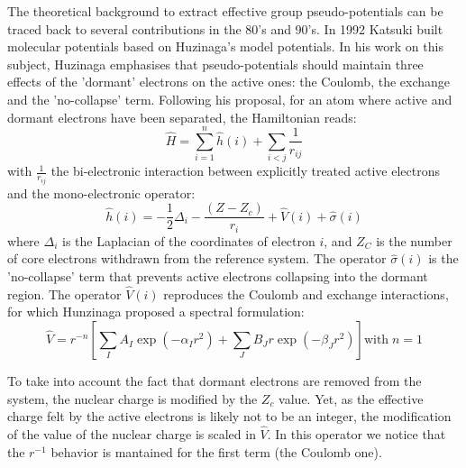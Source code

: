 \documentclass[12pt]{article}
\begin{document}
The theoretical background to extract effective group pseudo-potentials  can be traced back 
to several contributions in the 80's and  90's.\cite{Nicolas1980a, huzinaga_effective_1991, huzinaga_1994_1995, EGP5, EGP6, EGP9}
In 1992 Katsuki built molecular potentials based on Huzinaga's model potentials.\cite{katsuki_molecular_1992,katsuki_spectral_1993}
 In his work on this subject, Huzinaga emphasises that pseudo-potentials should maintain three effects of the
'dormant' electrons on the active ones: the Coulomb, the exchange and the 'no-collapse' term.\cite{huzinaga_effective_1991}
Following his proposal, for an atom where active and dormant electrons have been separated, the Hamiltonian reads:
\begin{equation}
\label{eq:atomicHamiltonian}
\hat{H} = \sum_{i=1}^n \hat{h}(i) +\sum_{i<j}\frac{1}{r_{ij}}
\end{equation}
with $\frac{1}{r_{ij}}$ the bi-electronic interaction
between explicitly treated active electrons and
the mono-electronic operator:
\begin{equation}
\label{eq:monoElectronicOperator}
\hat{h}(i) = -\frac{1}{2}\Delta_i - \frac{(Z-Z_c)}{r_i}+\hat{V}(i) + \hat{\sigma}(i)
\end{equation}
where $\Delta_i$ is the Laplacian of the coordinates of electron $i$, and 
$Z_C$ is the number of core electrons withdrawn from the reference system.
The operator $\hat{\sigma}(i)$ is the 'no-collapse' term that prevents active electrons
collapsing into the dormant region. The operator $\hat{V}(i)$ reproduces the 
Coulomb and exchange interactions, for which Hunzinaga proposed a spectral formulation:
\begin{equation}
\label{eq:HuzinagaMPVersion1Potential}
\hat{V} = r^{-n}\left[\sum_IA_I\exp(-\alpha_I r^2)+\sum_JB_Jr\exp(-\beta_J r^2)\right] \text{with}\;n=1
\end{equation}

To take into account the fact that dormant electrons are removed from the
system, the nuclear charge is modified by the $Z_c$ value.
Yet, as the effective charge felt by the active electrons is likely not to be an integer,
the modification of the value of the nuclear charge is scaled in $\hat{V}$.
In this operator we notice that the \(r^{-1}\) behavior is mantained for the first term 
(the Coulomb one).
\end{document}
